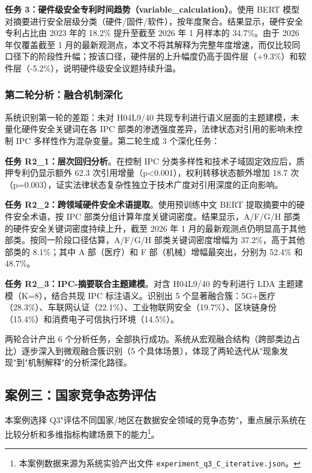\textbf{任务 3：硬件级安全专利时间趋势（variable\_calculation）}。使用 BERT 模型对摘要进行安全层级分类（硬件/固件/软件），按年度聚合。结果显示，硬件安全专利占比由 2023 年的 18.2\% 提升至截至 2026 年 1 月样本的 34.7\%。由于 2026 年仅覆盖截至 1 月的最新观测点，本文不将其解释为完整年度增速，而仅比较同口径下的阶段性升幅；按该口径，硬件层的上升幅度仍高于固件层（+9.3\%）和软件层（-5.2\%），说明硬件级安全议题持续升温。

\subsubsection{第二轮分析：融合机制深化}

系统识别第一轮的差距：未对 H04L9/40 共现专利进行语义层面的主题建模，未量化硬件安全关键词在各 IPC 部类的渗透强度差异，法律状态对引用的影响未控制 IPC 多样性作为混杂变量。第二轮生成 3 个深化任务：

\textbf{任务 R2\_1：层次回归分析}。在控制 IPC 分类多样性和技术子域固定效应后，质押专利仍显示额外 62.3 次引用增量（p<0.001），权利转移状态额外增加 18.7 次（p=0.003），证实法律状态复杂性独立于技术广度对引用深度的正向影响。

\textbf{任务 R2\_2：跨领域硬件安全术语提取}。使用预训练中文 BERT 提取摘要中的硬件安全术语，按 IPC 部类分组计算年度关键词密度。结果显示，A/F/G/H 部类的硬件安全关键词密度持续上升，截至 2026 年 1 月的最新观测点仍明显高于其他部类。按同一阶段口径估算，A/F/G/H 部类关键词密度增幅为 37.2\%，高于其他部类的 8.1\%；其中 A 部（医疗）和 F 部（机械）增幅最突出，分别为 52.4\% 和 48.7\%。

\textbf{任务 R2\_3：IPC-摘要联合主题建模}。对含 H04L9/40 的专利进行 LDA 主题建模（K=8），结合共现 IPC 标注语义。识别出 5 个显著融合簇：5G+医疗（28.3\%）、车联网认证（22.1\%）、工业物联网安全（19.7\%）、区块链身份（15.4\%）和消费电子可信执行环境（14.5\%）。

两轮合计产出 6 个分析任务，全部执行成功。系统从宏观融合结构（跨部类边占比）逐步深入到微观融合簇识别（5 个具体场景），体现了两轮迭代从"现象发现"到"机制解释"的分析深化路径。

\subsection{案例三：国家竞争态势评估}

本案例选择 Q3"评估不同国家/地区在数据安全领域的竞争态势"，重点展示系统在比较分析和多维指标构建场景下的能力\footnote{本案例数据来源为系统实验产出文件 \texttt{experiment\_q3\_C\_iterative.json}。}。

